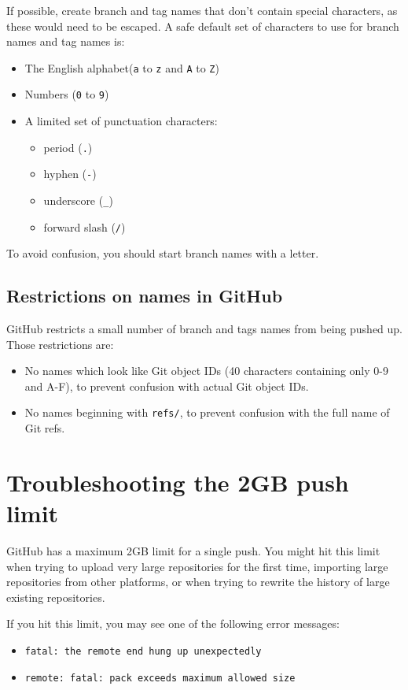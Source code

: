 If possible, create branch and tag names that don't contain special characters, as these would need to be escaped. A safe default set of characters to use for branch names and tag names is:
\begin{itemize}
    \item The English alphabet(\texttt{a} to \texttt{z} and \texttt{A} to \texttt{Z})
    \item Numbers (\texttt{0} to \texttt{9})
    \item A limited set of punctuation characters:
    \begin{itemize}
        \item period (\texttt{.})
        \item hyphen (\texttt{-})
        \item underscore (\texttt{\_})
        \item forward slash (\texttt{/})
    \end{itemize}
\end{itemize}
To avoid confusion, you should start branch names with a letter.

\subsection{Restrictions on names in GitHub}

GitHub restricts a small number of branch and tags names from being pushed up. Those restrictions are:
\begin{itemize}
    \item No names which look like Git object IDs (40 characters containing only 0-9 and A-F), to prevent confusion with actual Git object IDs.
    \item No names beginning with \texttt{refs/}, to prevent confusion with the full name of Git refs. 
\end{itemize}


\section{Troubleshooting the 2GB push limit}

GitHub has a maximum 2GB limit for a single push. You might hit this limit when trying to upload very large repositories for the first time, importing large repositories from other platforms, or when trying to rewrite the history of large existing repositories. 

If you hit this limit, you may see one of the following error messages:
\begin{itemize}
    \item \texttt{fatal: the remote end hung up unexpectedly}
    \item \texttt{remote: fatal: pack exceeds maximum allowed size}
\end{itemize}

